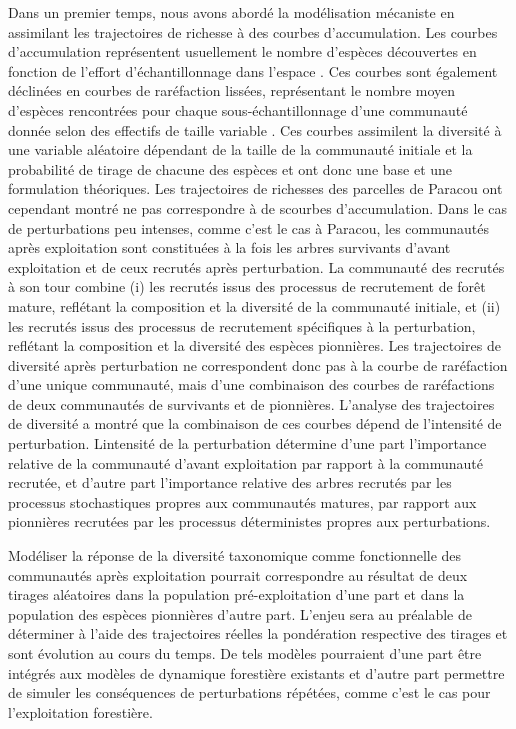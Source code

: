 \documentclass[
  11pt,
  french,
  A4paper,
  extrafontsizes,onecolumn,openright
  ]{memoir}
\begin{document}
Dans un premier temps, nous avons abordé la modélisation mécaniste en
assimilant les trajectoires de richesse à des courbes d'accumulation.
Les courbes d'accumulation représentent usuellement le nombre d'espèces
découvertes en fonction de l'effort d'échantillonnage dans l'espace
\autocite{Gotelli2001}. Ces courbes sont également déclinées en courbes
de raréfaction lissées, représentant le nombre moyen d'espèces
rencontrées pour chaque sous-échantillonnage d'une communauté donnée
selon des effectifs de taille variable \autocite{Ugland2003}. Ces
courbes assimilent la diversité à une variable aléatoire dépendant de la
taille de la communauté initiale et la probabilité de tirage de chacune
des espèces et ont donc une base et une formulation théoriques. Les
trajectoires de richesses des parcelles de Paracou ont cependant montré
ne pas correspondre à de scourbes d'accumulation. Dans le cas de
perturbations peu intenses, comme c'est le cas à Paracou, les
communautés après exploitation sont constituées à la fois les arbres
survivants d'avant exploitation et de ceux recrutés après perturbation.
La communauté des recrutés à son tour combine (i) les recrutés issus des
processus de recrutement de forêt mature, reflétant la composition et la
diversité de la communauté initiale, et (ii) les recrutés issus des
processus de recrutement spécifiques à la perturbation, reflétant la
composition et la diversité des espèces pionnières. Les trajectoires de
diversité après perturbation ne correspondent donc pas à la courbe de
raréfaction d'une unique communauté, mais d'une combinaison des courbes
de raréfactions de deux communautés de survivants et de pionnières.
L'analyse des trajectoires de diversité a montré que la combinaison de
ces courbes dépend de l'intensité de perturbation. Lintensité de la
perturbation détermine d'une part l'importance relative de la communauté
d'avant exploitation par rapport à la communauté recrutée, et d'autre
part l'importance relative des arbres recrutés par les processus
stochastiques propres aux communautés matures, par rapport aux
pionnières recrutées par les processus déterministes propres aux
perturbations.

Modéliser la réponse de la diversité taxonomique comme fonctionnelle des
communautés après exploitation pourrait correspondre au résultat de deux
tirages aléatoires dans la population pré-exploitation d'une part et
dans la population des espèces pionnières d'autre part. L'enjeu sera au
préalable de déterminer à l'aide des trajectoires réelles la pondération
respective des tirages et sont évolution au cours du temps. De tels
modèles pourraient d'une part être intégrés aux modèles de dynamique
forestière existants et d'autre part permettre de simuler les
conséquences de perturbations répétées, comme c'est le cas pour
l'exploitation forestière.
\end{document}
